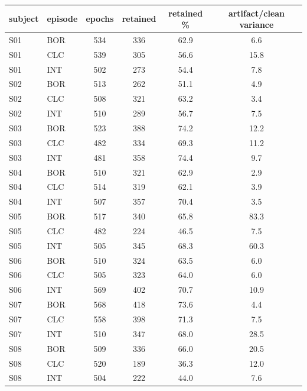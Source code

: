 \begin{tabular}{llcccc}
\hline
subject & episode & epochs & retained & retained \% & artifact/clean variance \\
\hline
S01 & BOR & 534 & 336 & 62.9 & 6.6 \\
S01 & CLC & 539 & 305 & 56.6 & 15.8 \\
S01 & INT & 502 & 273 & 54.4 & 7.8 \\
S02 & BOR & 513 & 262 & 51.1 & 4.9 \\
S02 & CLC & 508 & 321 & 63.2 & 3.4 \\
S02 & INT & 510 & 289 & 56.7 & 7.5 \\
S03 & BOR & 523 & 388 & 74.2 & 12.2 \\
S03 & CLC & 482 & 334 & 69.3 & 11.2 \\
S03 & INT & 481 & 358 & 74.4 & 9.7 \\
S04 & BOR & 510 & 321 & 62.9 & 2.9 \\
S04 & CLC & 514 & 319 & 62.1 & 3.9 \\
S04 & INT & 507 & 357 & 70.4 & 3.5 \\
S05 & BOR & 517 & 340 & 65.8 & 83.3 \\
S05 & CLC & 482 & 224 & 46.5 & 7.5 \\
S05 & INT & 505 & 345 & 68.3 & 60.3 \\
S06 & BOR & 510 & 324 & 63.5 & 6.0 \\
S06 & CLC & 505 & 323 & 64.0 & 6.0 \\
S06 & INT & 569 & 402 & 70.7 & 10.9 \\
S07 & BOR & 568 & 418 & 73.6 & 4.4 \\
S07 & CLC & 558 & 398 & 71.3 & 7.5 \\
S07 & INT & 510 & 347 & 68.0 & 28.5 \\
S08 & BOR & 509 & 336 & 66.0 & 20.5 \\
S08 & CLC & 520 & 189 & 36.3 & 12.0 \\
S08 & INT & 504 & 222 & 44.0 & 7.6 \\
\hline
\end{tabular}
